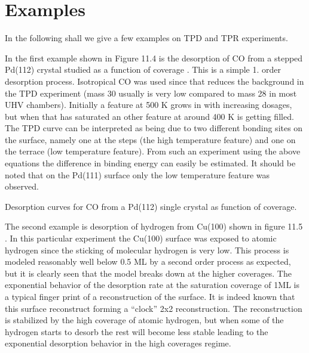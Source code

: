\vspace{1cm}





\section{Examples}

In the following shall we give a few examples on TPD and TPR experiments.

In the first example shown in Figure 11.4 is the desorption of CO from a stepped Pd(112) crystal studied as a function of coverage \cite{Yates1}. This is a simple 1. order desorption process. Isotropical CO was used since that reduces the background in the TPD experiment (mass 30 usually is very low compared to mass 28 in most UHV chambers). Initially a feature at 500 K grows in with increasing dosages, but when that has saturated an other feature at around 400 K is getting filled. The TPD curve can be interpreted as being due to two different bonding sites on the surface, namely one at the steps (the high temperature feature) and one on the terrace (low temperature feature). From such an experiment using the above equations the difference in binding energy can easily be estimated. It should be noted that on the Pd(111) surface only the low temperature feature was observed.


\vspace*{11cm}

 Desorption curves for CO from a Pd(112) single crystal as function of coverage.

\vspace{1cm}

The second example is desorption of hydrogen from Cu(100) shown in figure 11.5 \cite{Rasmussen}. In this particular experiment the Cu(100) surface was exposed to atomic hydrogen since the sticking of molecular hydrogen is very low. This process  is modeled reasonably well below 0.5 ML by a second order process as expected, but it is clearly seen that the model breaks down at the higher coverages. The exponential behavior of the desorption rate at the saturation coverage of 1ML is a typical finger print of a reconstruction of the surface. It is indeed known that this surface reconstruct forming a ``clock'' 2x2 reconstruction. The reconstruction is stabilized by the high coverage of atomic hydrogen, but when some of the hydrogen starts to desorb the rest will become less stable leading to the exponential desorption behavior in the high coverages regime.

